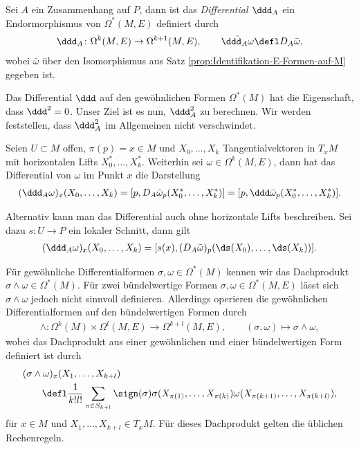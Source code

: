 \documentclass[%
	paper=a5,%
	fleqn,%
	DIV=18,%
	BCOR=0mm,
	fontsize=11pt,
	titlepage=false,%
	bibliography=totoc,
	DIV=18,%
	twoside=true,
	pdftitle=Riemannsche Geometrie,
	pdfauthor=Uwe Semmelmann,
	numbers=noendperiod]%
	{scrbook}
\begin{document}
\begin{defn}
Sei $A$ ein Zusammenhang auf $P$, dann ist das \emph{Differential $\ddd_A$}
ein Endormorphismus von $\Omega^*(M,E)$ definiert durch
\begin{align*}
\ddd_A \colon \Omega^k(M,E)\to\Omega^{k+1}(M,E),\qquad \bar{\ddd_A \omega} \defl
D_A\bar{\omega},
\end{align*}
wobei $\bar{\omega}$ über den Isomorphismus aus Satz
\ref{prop:Identifikation-E-Formen-auf-M} gegeben ist.\fish
\end{defn}

Das Differential $\ddd$ auf den gewöhnlichen Formen $\Omega^*(M)$ hat die
Eigenschaft, dass $\ddd^2 = 0$. Unser Ziel ist es nun, $\ddd_A^2$ zu
berechnen. Wir werden feststellen, dass $\ddd_A^2$ im Allgemeinen nicht
verschwindet.

\begin{rem}[Bemerkungen.]
\begin{remenum}
\item Seien $U\subset M$ offen, $\pi(p) = x\in M$ und $X_0,\ldots,X_k$
Tangentialvektoren in $T_xM$ mit horizontalen Lifts $X_0^*,\ldots,X_k^*$.
Weiterhin sei $\omega\in\Omega^k(M,E)$, dann hat das Differential von $\omega$
im Punkt $x$ die Darstellung
\begin{align*}
(\ddd_A\omega)_x(X_0,\ldots,X_k) = 
[p,D_A\bar{\omega}_p(X_0^*,\ldots,X_k^*)]= 
[p,\ddd \bar{\omega}_p(X_0^*,\ldots,X_k^*)].
\end{align*}

Alternativ kann man das Differential auch ohne horizontale Lifts beschreiben.
Sei dazu $s\colon U\to P$ ein lokaler Schnitt, dann gilt
\begin{align*}
(\ddd_A\omega)_x(X_0,\ldots,X_k) = 
[s(x),(D_A \bar{\omega})_p(\ds(X_0),\ldots,\ds(X_k))].
\end{align*}
\item Für gewöhnliche Differentialformen $\sigma,\omega\in\Omega^*(M)$ kennen
wir das Dachprodukt $\sigma\wedge \omega\in\Omega^*(M)$. Für zwei bündelwertige
Formen $\sigma,\omega\in \Omega^*(M,E)$  lässt sich 
$\sigma\wedge\omega$ jedoch nicht sinnvoll definieren. Allerdings operieren
die gewöhnlichen Differentialformen auf den bündelwertigen Formen  durch
\begin{align*}
\wedge : \Omega^k(M)\times \Omega^l(M,E) \to \Omega^{k+l}(M,E),\qquad
(\sigma,\omega) \mapsto \sigma\wedge \omega,
\end{align*}
wobei das Dachprodukt aus einer gewöhnlichen und einer bündelwertigen Form
definiert ist durch
\begin{align*}
&(\sigma\wedge \omega)_x(X_1,\ldots,X_{k+l}) \\ &\qquad \defl 
\frac{1}{k!l!} \sum_{\pi\in S_{k+l}} \sign(\sigma)
\sigma(X_{\pi(1)},\ldots,X_{\pi(k)})\omega(X_{\pi(k+1)},\ldots,X_{\pi(k+l)}),
\end{align*}
für $x\in M$ und $X_1,\ldots,X_{k+l}\in T_xM$. Für dieses Dachprodukt gelten die
üblichen Rechenregeln.\map
\end{remenum}
\end{rem}
\end{document}
